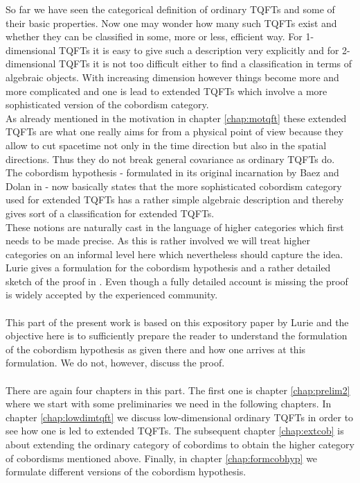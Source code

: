 So far we have seen the categorical definition of ordinary TQFTs and some of their basic properties. Now one may wonder how many such TQFTs exist and whether they can be classified in some, more or less, efficient way. For 1-dimensional TQFTs it is easy to give such a description very explicitly and for 2-dimensional TQFTs it is not too difficult either to find a classification in terms of algebraic objects. With increasing dimension however things become more and more complicated and one is lead to extended TQFTs which involve a more sophisticated version of the cobordism category.
\\
As already mentioned in the motivation in chapter \ref{chap:motqft} these extended TQFTs are what one really aims for from a physical point of view because they allow to cut spacetime not only in the time direction but also in the spatial directions. Thus they do not break general covariance as ordinary TQFTs do.
\\
The cobordism hypothesis - formulated in its original incarnation by Baez and Dolan in \cite{cc6d78b5} - now basically states that the more sophisticated cobordism category used for extended TQFTs has a rather simple algebraic description and thereby gives sort of a classification for extended TQFTs.
\\
These notions are naturally cast in the language of higher categories which first needs to be made precise. As this is rather involved we will treat higher categories on an informal level here which nevertheless should capture the idea.
\\
Lurie gives a formulation for the cobordism hypothesis and a rather detailed sketch of the proof in \cite{dfcdc48c}. Even though a fully detailed account is missing the proof is widely accepted by the experienced community.
\\\\
This part of the present work is based on this expository paper \cite{dfcdc48c} by Lurie and the objective here is to sufficiently prepare the reader to understand the formulation of the cobordism hypothesis as given there and how one arrives at this formulation. We do not, however, discuss the proof.
\\\\
There are again four chapters in this part. The first one is chapter \ref{chap:prelim2} where we start with some preliminaries we need in the following chapters. In chapter \ref{chap:lowdimtqft} we discuss low-dimensional ordinary TQFTs in order to see how one is led to extended TQFTs. The subsequent chapter \ref{chap:extcob} is about extending the ordinary category of cobordims to obtain the higher category of cobordisms mentioned above. Finally, in chapter \ref{chap:formcobhyp} we formulate different versions of the cobordism hypothesis.
